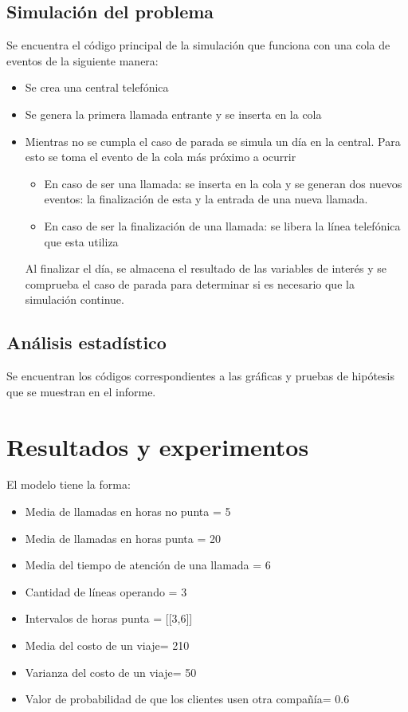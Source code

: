 \documentclass{article}
\begin{document}
	\subsection*{Simulación del problema}
	Se encuentra el código principal de la simulación que funciona con una cola de eventos de la siguiente manera:
	\begin{itemize}[left=2em]
		\item Se crea una central telefónica 
		\item Se genera la primera llamada entrante y se inserta en la cola 
		\item Mientras no se cumpla el caso de parada se simula un día en la central. Para esto se toma el evento de la cola más próximo a ocurrir 
		\begin{itemize}
			\item En caso de ser una llamada: se inserta en la cola y se generan dos nuevos eventos: la finalización de esta y la entrada de una nueva llamada.
			\item En caso de ser la finalización de una llamada: se libera la línea telefónica que esta utiliza
		\end{itemize}
		Al finalizar el día, se almacena el resultado de las variables de interés y se comprueba el caso de parada para determinar si es necesario que la simulación continue.
	\end{itemize}
	
	\subsection*{Análisis estadístico}
	Se encuentran los códigos correspondientes a las gráficas y pruebas de hipótesis que se muestran en el informe.

	
	\section*{Resultados y experimentos}
		El modelo tiene la forma:
		\begin{itemize}[left=2em]
			\item Media de llamadas en horas no punta = 5
			\item Media de llamadas en horas punta = 20
			\item Media del tiempo de atención de una llamada = 6
			\item Cantidad de líneas operando = 3
			\item Intervalos de horas punta = [[3,6]]
			\item Media del costo de un viaje= 210
			\item Varianza del costo de un viaje= 50
			\item Valor de probabilidad de que los clientes usen otra compañía= 0.6
	   \end{itemize}
	
\end{document}
